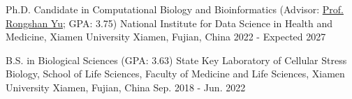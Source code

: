

\begin{cventries}
  \cventry
    {Ph.D. Candidate in Computational Biology and Bioinformatics (Advisor: \href{https://scholar.google.com/citations?hl=en\&user=Uh1EpKQAAAAJ}{Prof. Rongshan Yu}; GPA: 3.75)}
    {National Institute for Data Science in Health and Medicine, Xiamen University}
    {Xiamen, Fujian, China}
    {2022 - Expected 2027}
    {}

  \cventry
    {B.S. in Biological Sciences (GPA: 3.63)}
    {State Key Laboratory of Cellular Stress Biology, School of Life Sciences, Faculty of Medicine and Life Sciences, Xiamen University}
    {Xiamen, Fujian, China}
    {Sep. 2018 - Jun. 2022}
    {}
\end{cventries}
